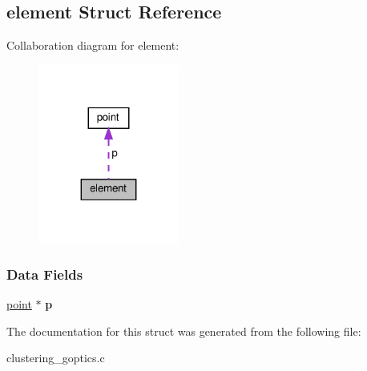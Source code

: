 \hypertarget{structelement}{}\subsection{element Struct Reference}
\label{structelement}


Collaboration diagram for element\+:\nopagebreak
\begin{figure}[H]
\begin{center}
\leavevmode
\includegraphics[width=131pt]{structelement__coll__graph}
\end{center}
\end{figure}
\subsubsection*{Data Fields}
\begin{DoxyCompactItemize}
\item 
\mbox{\label{structelement_a4dce87d4907bb76f07b538b48567b03a}} 
\hyperlink{structpoint}{point} $\ast$ {\bfseries p}
\end{DoxyCompactItemize}


The documentation for this struct was generated from the following file\+:\begin{DoxyCompactItemize}
\item 
clustering\+\_\+goptics.\+c\end{DoxyCompactItemize}

